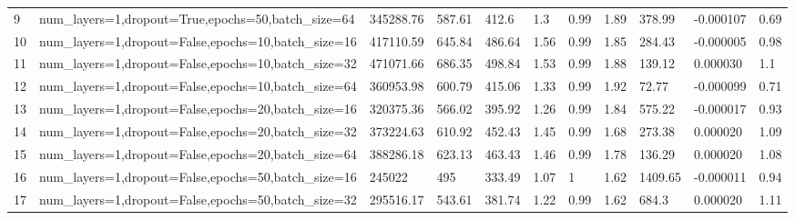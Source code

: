 \begin{longtable}{C{0.8cm} L{2cm} C{1.15cm} C{1.15cm} C{1.15cm} C{1.15cm} C{0.85cm} C{1.25cm} C{1.2cm} C{1.5cm} C{1.0cm}}
9 & num\_layers=1,\newline dropout=True,\newline epochs=50,\newline batch\_size=64 & 345288.76 & 587.61 & 412.6 & 1.3 & 0.99 & 1.89 & 378.99 & -0.000107 & 0.69 \\
10 & num\_layers=1,\newline dropout=False,\newline epochs=10,\newline batch\_size=16 & 417110.59 & 645.84 & 486.64 & 1.56 & 0.99 & 1.85 & 284.43 & -0.000005 & 0.98 \\
11 & num\_layers=1,\newline dropout=False,\newline epochs=10,\newline batch\_size=32 & 471071.66 & 686.35 & 498.84 & 1.53 & 0.99 & 1.88 & 139.12 & 0.000030 & 1.1 \\
12 & num\_layers=1,\newline dropout=False,\newline epochs=10,\newline batch\_size=64 & 360953.98 & 600.79 & 415.06 & 1.33 & 0.99 & 1.92 & 72.77 & -0.000099 & 0.71 \\
13 & num\_layers=1,\newline dropout=False,\newline epochs=20,\newline batch\_size=16 & 320375.36 & 566.02 & 395.92 & 1.26 & 0.99 & 1.84 & 575.22 & -0.000017 & 0.93 \\
14 & num\_layers=1,\newline dropout=False,\newline epochs=20,\newline batch\_size=32 & 373224.63 & 610.92 & 452.43 & 1.45 & 0.99 & 1.68 & 273.38 & 0.000020 & 1.09 \\
15 & num\_layers=1,\newline dropout=False,\newline epochs=20,\newline batch\_size=64 & 388286.18 & 623.13 & 463.43 & 1.46 & 0.99 & 1.78 & 136.29 & 0.000020 & 1.08 \\
16 & num\_layers=1,\newline dropout=False,\newline epochs=50,\newline batch\_size=16 & 245022 & 495 & 333.49 & 1.07 & 1 & 1.62 & 1409.65 & -0.000011 & 0.94 \\
17 & num\_layers=1,\newline dropout=False,\newline epochs=50,\newline batch\_size=32 & 295516.17 & 543.61 & 381.74 & 1.22 & 0.99 & 1.62 & 684.3 & 0.000020 & 1.11 \\

\end{longtable}
